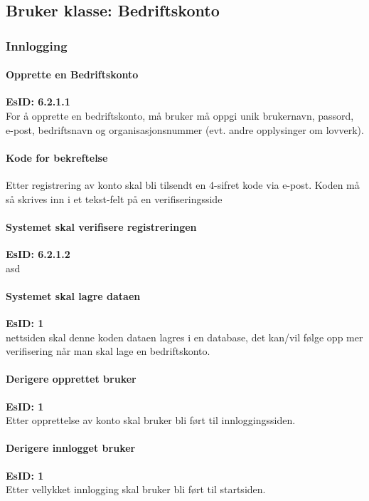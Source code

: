 \documentclass[12pt]{article}
\newcommand{\EsID}[1]{\textbf{EsID: #1}\\}
\begin{document}
    \subsection{Bruker klasse: Bedriftskonto}

        \subsubsection{Innlogging}
            
            \paragraph{Opprette en Bedriftskonto}
            \EsID{6.2.1.1}
            For å opprette en bedriftskonto, må bruker må oppgi unik brukernavn, passord, e-post, bedriftsnavn og organisasjonsnummer (evt. andre opplysinger om lovverk).

            \paragraph{Kode for bekreftelse}
            Etter registrering av konto skal bli tilsendt en 4-sifret kode via e-post. Koden må så skrives inn i et tekst-felt på en verifiseringsside

            \paragraph{Systemet skal verifisere registreringen}
            \EsID{6.2.1.2} asd

            \paragraph{Systemet skal lagre dataen}
            \EsID{1}
            nettsiden skal denne koden dataen lagres i en database, det kan/vil følge opp mer verifisering når man skal lage en bedriftskonto.

            \paragraph{Derigere opprettet bruker}
            \EsID{1}
            Etter opprettelse av konto skal bruker bli ført til innloggingssiden.

            \paragraph{Derigere innlogget bruker}
            \EsID{1}
            Etter vellykket innlogging skal bruker bli ført til startsiden.
\end{document}
